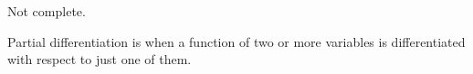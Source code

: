 Not complete.

Partial differentiation is when a function of two or more variables is differentiated with respect to just one of them.